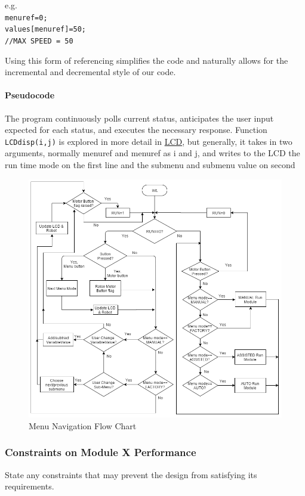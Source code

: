 \documentclass{article}
\begin{document}
	e.g.\\
	\texttt{menu\textunderscore ref=0;\\values[menu\textunderscore ref]=50;\\//MAX SPEED = 50}
	
	Using this form of referencing simplifies the code and naturally allows for the incremental and decremental style of our code.
	
	\paragraph{Pseudocode}
		The program continuously polls current status, anticipates the user input expected for each status, and executes the necessary response. Function \texttt{LCD\textunderscore disp(i,j)} is explored in more detail in \underline{LCD}, but generally, it takes in two arguments, normally menu\textunderscore ref and menu\textunderscore ref as i and j, and writes to the LCD the run time mode on the first line and the submenu and submenu value on second\\
		
		
		
			\begin{figure}[h]
				\includegraphics[scale=0.45]{menu_navFlowChart.png}
				\centering
				\caption{Menu Navigation Flow Chart}
			\end{figure}
	
	
	
	\subsubsection{Constraints on Module X Performance}
	State any constraints that may prevent the design from satisfying its requirements.
	
	
	
	
\end{document}
